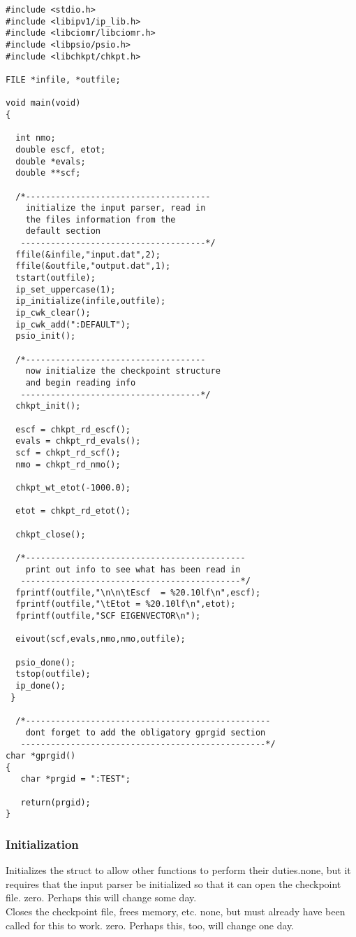 \begin{verbatim}
#include <stdio.h>
#include <libipv1/ip_lib.h>
#include <libciomr/libciomr.h>
#include <libpsio/psio.h>
#include <libchkpt/chkpt.h>

FILE *infile, *outfile;

void main(void)
{
 
  int nmo;
  double escf, etot;
  double *evals;
  double **scf;

  /*-------------------------------------
    initialize the input parser, read in
    the files information from the
    default section
   -------------------------------------*/
  ffile(&infile,"input.dat",2);
  ffile(&outfile,"output.dat",1);
  tstart(outfile);
  ip_set_uppercase(1);
  ip_initialize(infile,outfile);
  ip_cwk_clear();
  ip_cwk_add(":DEFAULT");
  psio_init();

  /*------------------------------------
    now initialize the checkpoint structure
    and begin reading info
   ------------------------------------*/
  chkpt_init();

  escf = chkpt_rd_escf();
  evals = chkpt_rd_evals();
  scf = chkpt_rd_scf();
  nmo = chkpt_rd_nmo();
 
  chkpt_wt_etot(-1000.0);
  
  etot = chkpt_rd_etot();

  chkpt_close();

  /*--------------------------------------------
    print out info to see what has been read in
   --------------------------------------------*/
  fprintf(outfile,"\n\n\tEscf  = %20.10lf\n",escf);
  fprintf(outfile,"\tEtot = %20.10lf\n",etot);
  fprintf(outfile,"SCF EIGENVECTOR\n");

  eivout(scf,evals,nmo,nmo,outfile); 
  
  psio_done();
  tstop(outfile);
  ip_done();
 }

  /*-------------------------------------------------
    dont forget to add the obligatory gprgid section 
   -------------------------------------------------*/
char *gprgid()
{
   char *prgid = ":TEST";

   return(prgid);
}
\end{verbatim}

\subsubsection{Initialization}
{Initializes the  struct to allow other 
functions to perform their duties.}{none, but it requires that
the input parser be initialized so that it can open the checkpoint file.}
{zero.  Perhaps this will change some day.} \\
{Closes the checkpoint file, frees memory, etc.}
{none, but  must already have been called for
this to work.}
{zero.  Perhaps this, too, will change one day.}

